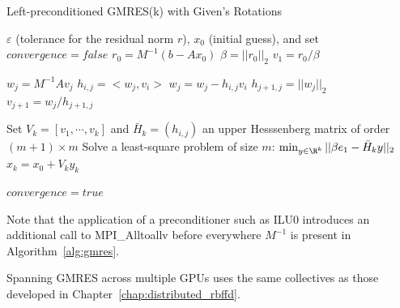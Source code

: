 

\begin{algorithm}                      %
\caption{Left-preconditioned GMRES(k) with Given's Rotations}          %
\label{alg:gmres}                           %
\begin{algorithmic}[1]                    %
    \State $\varepsilon$ (tolerance for the residual norm $r$), $x_0$ (initial guess), and set $convergence = false$
    \State $r_0 = M^{-1} (b-Ax_0)$
    \State $\beta = ||r_0||_2$			
    \State $v_1 = r_0 / \beta$ 

			\State $w_j = M^{-1} A v_j$   
				\State $h_{i,j} = <w_j, v_i>$ 
				\State $w_j = w_j - h_{i,j} v_i$
			\EndFor %
			\State $h_{j+1, j}  = ||w_j||_2$		
			\State $v_{j+1} = w_j / h_{j+1,j}$		
	\EndFor %

			\State Set $V_k = [v_1, \cdots, v_k]$ and $\bar{H}_k = (h_{i,j})$ an upper Hesssenberg matrix of order $(m+1)\times m$
			\State Solve a least-square problem of size $m$: $\min_{y \in \R^k} ||\beta e_1 - \bar{H}_k y||_2$ %
			\State $x_k = x_0 + V_k y_k$ %

		\State $convergence = true$
	\EndIf
    \EndWhile
\end{algorithmic}
\end{algorithm}



Note that the application of a preconditioner such as ILU0 introduces an additional call to MPI\_Alltoallv before everywhere $M^{-1}$ is present in Algorithm~\ref{alg:gmres}.

Spanning GMRES across multiple GPUs uses the same collectives as those developed in Chapter~\ref{chap:distributed_rbffd}. 


